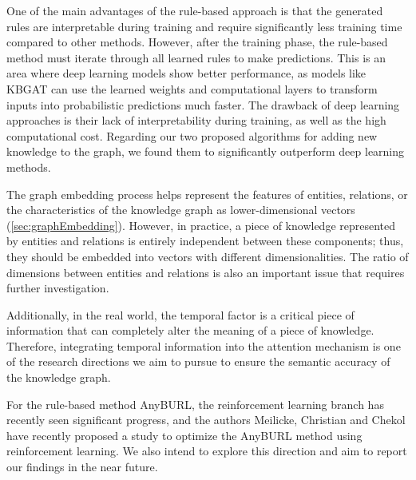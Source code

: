 One of the main advantages of the rule-based approach is that the generated rules are interpretable during training and require significantly less training time compared to other methods. However, after the training phase, the rule-based method must iterate through all learned rules to make predictions. This is an area where deep learning models show better performance, as models like KBGAT can use the learned weights and computational layers to transform inputs into probabilistic predictions much faster. The drawback of deep learning approaches is their lack of interpretability during training, as well as the high computational cost. Regarding our two proposed algorithms for adding new knowledge to the graph, we found them to significantly outperform deep learning methods.






The graph embedding process helps represent the features of entities, relations, or the characteristics of the knowledge graph as lower-dimensional vectors (\autoref{sec:graphEmbedding}). However, in practice, a piece of knowledge represented by entities and relations is entirely independent between these components; thus, they should be embedded into vectors with different dimensionalities. The ratio of dimensions between entities and relations is also an important issue that requires further investigation. 

Additionally, in the real world, the temporal factor is a critical piece of information that can completely alter the meaning of a piece of knowledge. Therefore, integrating temporal information into the attention mechanism is one of the research directions we aim to pursue to ensure the semantic accuracy of the knowledge graph.

For the rule-based method AnyBURL, the reinforcement learning branch has recently seen significant progress, and the authors Meilicke, Christian and Chekol \cite{meilicke2020reinforced} have recently proposed a study to optimize the AnyBURL method using reinforcement learning. We also intend to explore this direction and aim to report our findings in the near future.
